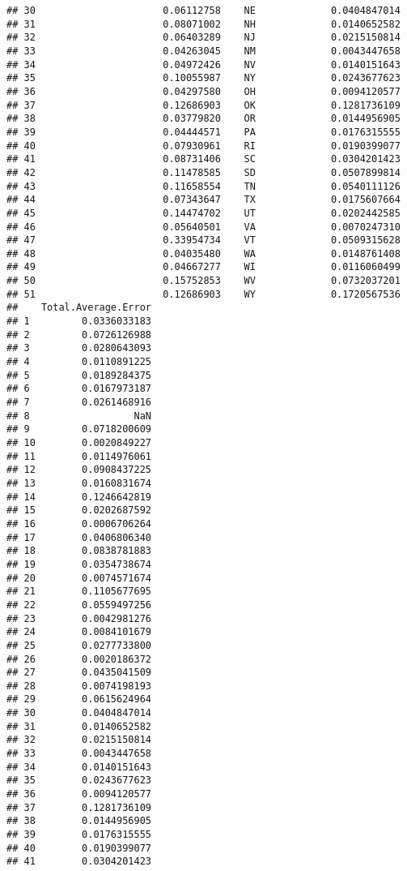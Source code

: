 \documentclass{article}\usepackage[]{graphicx}\usepackage[]{color}
\makeatletter
\newenvironment{kframe}{%
 \def\at@end@of@kframe{}%
 \ifinner\ifhmode%
  \def\at@end@of@kframe{\end{minipage}}%
  \begin{minipage}{\columnwidth}%
 \fi\fi%
 \def\FrameCommand##1{\hskip\@totalleftmargin \hskip-\fboxsep
 \colorbox{shadecolor}{##1}\hskip-\fboxsep
     \hskip-\linewidth \hskip-\@totalleftmargin \hskip\columnwidth}%
 \MakeFramed {\advance\hsize-\width
   \@totalleftmargin\z@ \linewidth\hsize
   \@setminipage}}%
 {\par\unskip\endMakeFramed%
 \at@end@of@kframe}
\newenvironment{knitrout}{}{} %
\makeatother
\begin{document}
\begin{knitrout}
\begin{kframe}
\begin{verbatim}
## 30                      0.06112758    NE             0.0404847014
## 31                      0.08071002    NH             0.0140652582
## 32                      0.06403289    NJ             0.0215150814
## 33                      0.04263045    NM             0.0043447658
## 34                      0.04972426    NV             0.0140151643
## 35                      0.10055987    NY             0.0243677623
## 36                      0.04297580    OH             0.0094120577
## 37                      0.12686903    OK             0.1281736109
## 38                      0.03779820    OR             0.0144956905
## 39                      0.04444571    PA             0.0176315555
## 40                      0.07930961    RI             0.0190399077
## 41                      0.08731406    SC             0.0304201423
## 42                      0.11478585    SD             0.0507899814
## 43                      0.11658554    TN             0.0540111126
## 44                      0.07343647    TX             0.0175607664
## 45                      0.14474702    UT             0.0202442585
## 46                      0.05640501    VA             0.0070247310
## 47                      0.33954734    VT             0.0509315628
## 48                      0.04035480    WA             0.0148761408
## 49                      0.04667277    WI             0.0116060499
## 50                      0.15752853    WV             0.0732037201
## 51                      0.12686903    WY             0.1720567536
##    Total.Average.Error
## 1         0.0336033183
## 2         0.0726126988
## 3         0.0280643093
## 4         0.0110891225
## 5         0.0189284375
## 6         0.0167973187
## 7         0.0261468916
## 8                  NaN
## 9         0.0718200609
## 10        0.0020849227
## 11        0.0114976061
## 12        0.0908437225
## 13        0.0160831674
## 14        0.1246642819
## 15        0.0202687592
## 16        0.0006706264
## 17        0.0406806340
## 18        0.0838781883
## 19        0.0354738674
## 20        0.0074571674
## 21        0.1105677695
## 22        0.0559497256
## 23        0.0042981276
## 24        0.0084101679
## 25        0.0277733800
## 26        0.0020186372
## 27        0.0435041509
## 28        0.0074198193
## 29        0.0615624964
## 30        0.0404847014
## 31        0.0140652582
## 32        0.0215150814
## 33        0.0043447658
## 34        0.0140151643
## 35        0.0243677623
## 36        0.0094120577
## 37        0.1281736109
## 38        0.0144956905
## 39        0.0176315555
## 40        0.0190399077
## 41        0.0304201423

\end{verbatim}
\end{kframe}
\end{knitrout}
\end{document}

